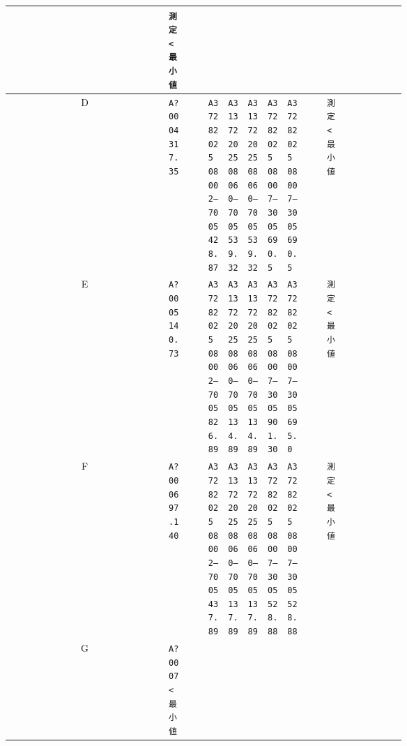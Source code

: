 \documentclass[UTF8,10pt,a4paper,fontset=fandol]{ctexart}
\begin{document}
\begin{center}
\begin{tabular}{c|*{12}{p{0.055\linewidth}|}}
 &
\texttt{測定\\\textless{}最小値} &
 &
 &
\\ \hline
D &
\texttt{A?0004\\317.35} &
 &
\texttt{A37282025\\08002--7005\\428.87} &
\texttt{A313722025\\08060--7005\\539.32} &
\texttt{A313722025\\08060--7005\\539.32} &
\texttt{A37282025\\08007--3005\\690.5} &
\texttt{A37282025\\08007--3005\\690.5} &
 &
\texttt{測定\\\textless{}最小値} &
 &
 &
\\ \hline
E &
\texttt{A?0005\\140.73} &
 &
\texttt{A37282025\\08002--7005\\826.89} &
\texttt{A313722025\\08060--7005\\134.89} &
\texttt{A313722025\\08060--7005\\134.89} &
\texttt{A37282025\\08007--3005\\901.30} &
\texttt{A37282025\\08007--3005\\695.0} &
 &
\texttt{測定\\\textless{}最小値} &
 &
 &
\\ \hline
F &
\texttt{A?0006\\97.140} &
 &
\texttt{A37282025\\08002--7005\\437.89} &
\texttt{A313722025\\08060--7005\\137.89} &
\texttt{A313722025\\08060--7005\\137.89} &
\texttt{A37282025\\08007--3005\\528.88} &
\texttt{A37282025\\08007--3005\\528.88} &
 &
\texttt{測定\\\textless{}最小値} &
 &
 &
\\ \hline
G &
\texttt{A?0007\\\textless{}最小値} &

\end{tabular}
\end{center}
\end{document}
